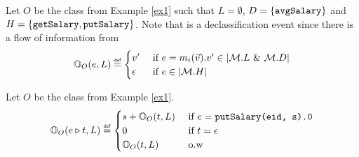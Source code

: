 \documentclass[acmsmall,screen,review, nonacm]{acmart}
\begin{document}
\begin{example} \label{ex2}
  Let $O$ be the class from Example \ref{ex1} such that  $L = \emptyset $, $D = \{ \texttt{avgSalary} \}$ and $H = \{\texttt{getSalary}, \texttt{putSalary} \}$.
  Note that  is a declassification event since there is a flow of information from 
  \[
  \ob{e}{O}{L} \isdef \begin{cases}
    v'  & \mbox{ if } e = m_i(\vec{v}).v' \in \abs{\classpart.L \directprod \classpart.D} \\
    \emptytr & \mbox{ if } e \in \abs{\classpart.H}
  \end{cases}
  \]
\end{example}



\begin{example}  \label{ex3}
  Let $O$ be the class from Example \ref{ex1}.
  \[
  \ob{e \tracecat t }{O}{L} \isdef \begin{cases}
    s + \ob{t}{O}{L}  & \mbox{ if } e = \mycode{putSalary(eid, s).0} \\
    0 & \mbox{ if } t = \epsilon \\
    \ob{t}{O}{L} & \mbox{ o.w } 
  \end{cases}
  \]
\end{example}


\end{document}
